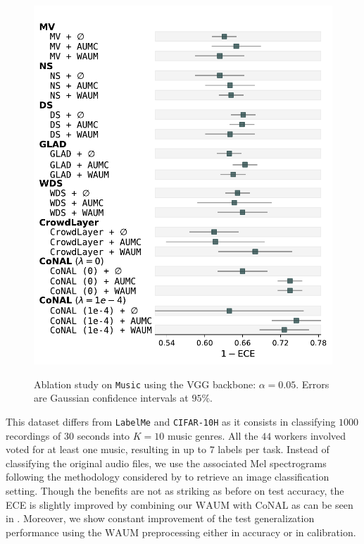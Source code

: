 \begin{figure}[thb]
\begin{minipage}{0.45\textwidth}
        \includegraphics[width=\linewidth]{images/ECE_foresplot_music.pdf}
        \label{fig:forest_music_ece}
    \end{minipage}
    \caption{Ablation study on \texttt{Music} using the VGG backbone: $\alpha=0.05$. Errors are Gaussian confidence intervals at $95\%$.}
    \label{fig:forest_music}
\end{figure}

This dataset differs from \texttt{LabelMe} and \texttt{CIFAR-10H} as it consists in classifying $1000$ recordings of $30$ seconds into $K=10$ music genres.
All the $44$ workers involved voted for at least one music, resulting in up to $7$ labels per task.
Instead of classifying the original audio files, we use the associated Mel spectrograms following the methodology considered by \citet{dong2018convolutional} to retrieve an image classification setting.
Though the benefits are not as striking as before on test accuracy, the ECE is slightly improved by combining our $\mathrm{WAUM}$ with $\mathrm{CoNAL}$ as can be seen in .
Moreover, we show constant improvement of the test generalization performance using the $\mathrm{WAUM}$ preprocessing either in accuracy or in calibration.

